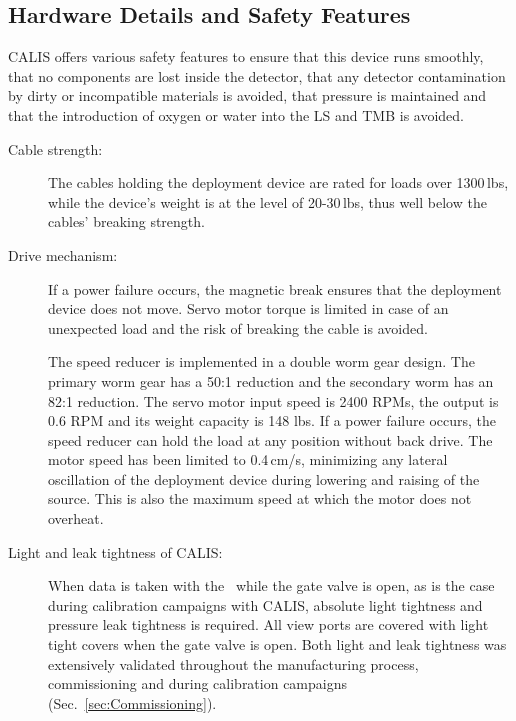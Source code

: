 \subsection{Hardware Details and Safety Features}\label{sec:HardwareDetails}\label{sec:SafetyFeatures}
CALIS offers various safety features to ensure that this device runs smoothly, that no components are lost inside the detector, that any detector contamination by dirty or incompatible materials is avoided, that pressure is maintained and that the introduction of oxygen or water into the LS and TMB is avoided. %

\begin{description}

\item[Cable strength:]
The cables holding the deployment device are rated for loads over 1300\,lbs, while the device's weight is at the level of 20-30\,lbs, thus well below the cables' breaking strength.

\item[Drive mechanism:]
If a power failure occurs, the magnetic break ensures that the deployment device does not move. Servo motor torque is limited in case of an unexpected load and the risk of breaking the cable is avoided.

The speed reducer is implemented in a double worm gear design. The primary worm gear has a 50:1 reduction and the secondary worm has an 82:1 reduction. The servo motor input speed is 2400 RPMs, the output is 0.6 RPM and its weight capacity is 148 lbs. If a power failure occurs, the speed reducer can hold the load at any position without back drive. The motor speed has been limited to 0.4\,cm/s, minimizing any lateral oscillation of the deployment device during lowering and raising of the source. This is also the maximum speed at which the motor does not overheat.

\item[Light and leak tightness of CALIS:]
When data is taken with the \lsv\ while the gate valve is open, as is the case during calibration campaigns with CALIS, absolute light tightness and pressure leak tightness is required. All view ports are covered with light tight covers when the gate valve is open. Both light and leak tightness was extensively validated throughout the manufacturing process, commissioning and during calibration campaigns (Sec.~\ref{sec:Commissioning}).


\end{description}
